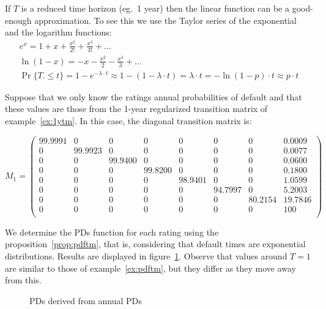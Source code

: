 \documentclass[11pt,fleqn]{book} %
\begin{document}
If $T$ is a reduced time horizon (eg.\ 1 year) then the linear function
can be a good-enough approximation. To see this we use the Taylor series
of the exponential and the logarithm functions:
\begin{displaymath}
	\begin{array}{l}
		e^x = 1 +x + \frac{x^2}{2!} + \frac{x^3}{3!} + \dots
		\\
		\ln(1-x) = -x - \frac{x^2}{2} - \frac{x^3}{3} + \dots
		\\
		\Pr\{T. \le t\} = 1-e^{-\lambda\cdot t} \approx
		1 - (1-\lambda \cdot t) = \lambda \cdot t = 
		- \ln(1-p) \cdot t \approx p \cdot t
	\end{array}
\end{displaymath}

\begin{example}
	\label{ex:pdfsv}
	Suppose that we only know the ratings annual probabilities of default 
	and that these values are those from the 1-year regularized transition 
	matrix of example~\ref{ex:1ytm}. In this case, the diagonal transition 
	matrix is:
	{\small
	\begin{displaymath}
		M_1 = \left(
		\begin{array}{cccccccc}
		99.9991 & 0 & 0 & 0 & 0 & 0 & 0 & 0.0009 \\
		0 & 99.9923 & 0 & 0 & 0 & 0 & 0 & 0.0077 \\
		0 & 0 & 99.9400 & 0 & 0 & 0 & 0 & 0.0600 \\
		0 & 0 & 0 & 99.8200 & 0 & 0 & 0 & 0.1800 \\
		0 & 0 & 0 & 0 & 98.9401 & 0 & 0 & 1.0599 \\
		0 & 0 & 0 & 0 & 0 & 94.7997 & 0 & 5.2003 \\
		0 & 0 & 0 & 0 & 0 & 0 & 80.2154 & 19.7846 \\
		0 & 0 & 0 & 0 & 0 & 0 & 0 & 100 \\
		\end{array}
		\right)
	\end{displaymath}\par}
	We determine the PDs function for each rating using the 
	proposition~\ref{prop:pdftm}, that is, considering that default times are 
	exponential distributions. Results are displayed in figure~\ref{fig:pdfsv}. 
	Observe that values around $T=1$ are similar to those of 
	example~\ref{ex:pdftm}, but they differ as they move away from this.
	\begin{figure}[!ht]
		\centering
		\caption{PDs derived from annual PDs}
		\label{fig:pdfsv}
	\end{figure}
\end{example}
\end{document}

